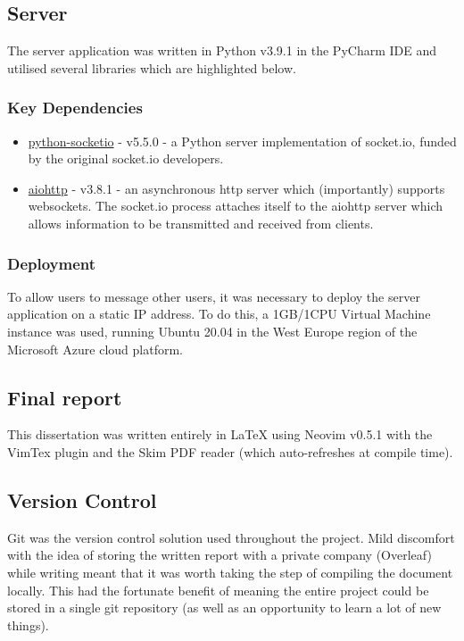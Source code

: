 \documentclass{mproj}
\begin{document}
\subsection{Server}
The server application was written in Python v3.9.1 in the PyCharm IDE and utilised several libraries which are highlighted below. 

\subsubsection{Key Dependencies}
\begin{itemize}
	\item \href{https://python-socketio.readthedocs.io/en/latest/index.html}{python-socketio} - v5.5.0 - a Python server implementation of socket.io, funded by the original socket.io developers.
	\item \href{https://docs.aiohttp.org/en/stable/}{aiohttp} - v3.8.1 - an asynchronous http server which (importantly) supports websockets. The socket.io process attaches itself to the aiohttp server which allows information to be transmitted and received from clients.
\end{itemize}

\subsubsection{Deployment}
To allow users to message other users, it was necessary to deploy the server application on a static IP address. To do this, a 1GB/1CPU Virtual Machine instance was used, running Ubuntu 20.04 in the West Europe region of the Microsoft Azure cloud platform. 

\subsection{Final report}
This dissertation was written entirely in LaTeX using Neovim v0.5.1 with the VimTex plugin and the Skim PDF reader (which auto-refreshes at compile time). 

\subsection{Version Control}
Git was the version control solution used throughout the project. Mild discomfort with the idea of storing the written report with a private company (Overleaf) while writing meant that it was worth taking the step of compiling the document locally. This had the fortunate benefit of meaning the entire project could be stored in a single git repository (as well as an opportunity to learn a lot of new things). 
\end{document}
